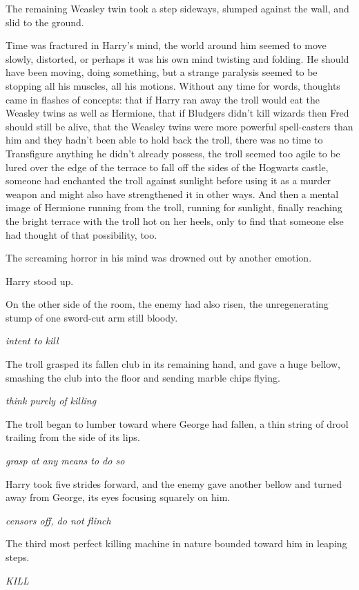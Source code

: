 The remaining Weasley twin took a step sideways, slumped against the wall, and slid to the ground.

Time was fractured in Harry's mind, the world around him seemed to move slowly, distorted, or perhaps it was his own mind twisting and folding. He should have been moving, doing something, but a strange paralysis seemed to be stopping all his muscles, all his motions. Without any time for words, thoughts came in flashes of concepts: that if Harry ran away the troll would eat the Weasley twins as well as Hermione, that if Bludgers didn't kill wizards then Fred should still be alive, that the Weasley twins were more powerful spell-casters than him and they hadn't been able to hold back the troll, there was no time to Transfigure anything he didn't already possess, the troll seemed too agile to be lured over the edge of the terrace to fall off the sides of the Hogwarts castle, someone had enchanted the troll against sunlight before using it as a murder weapon and might also have strengthened it in other ways. And then a mental image of Hermione running from the troll, running for sunlight, finally reaching the bright terrace with the troll hot on her heels, only to find that someone else had thought of that possibility, too.

The screaming horror in his mind was drowned out by another emotion.

Harry stood up.

On the other side of the room, the enemy had also risen, the unregenerating stump of one sword-cut arm still bloody.

\emph{intent to kill}

The troll grasped its fallen club in its remaining hand, and gave a huge bellow, smashing the club into the floor and sending marble chips flying.

\emph{think purely of killing}

The troll began to lumber toward where George had fallen, a thin string of drool trailing from the side of its lips.

\emph{grasp at any means to do so}

Harry took five strides forward, and the enemy gave another bellow and turned away from George, its eyes focusing squarely on him.

\emph{censors off, do not flinch}

The third most perfect killing machine in nature bounded toward him in leaping steps.

\emph{KILL}

